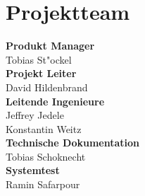 \chapter*{Projektteam}
\textbf{Produkt Manager}\\
Tobias St"ockel\\
\newline
\textbf{Projekt Leiter}\\
David Hildenbrand\\
\newline
\textbf{Leitende Ingenieure}\\
Jeffrey Jedele\\
Konstantin Weitz\\
\newline
\textbf{Technische Dokumentation}\\
Tobias Schoknecht\\
\newline\textbf{Systemtest}\\
Ramin Safarpour\\
\newline